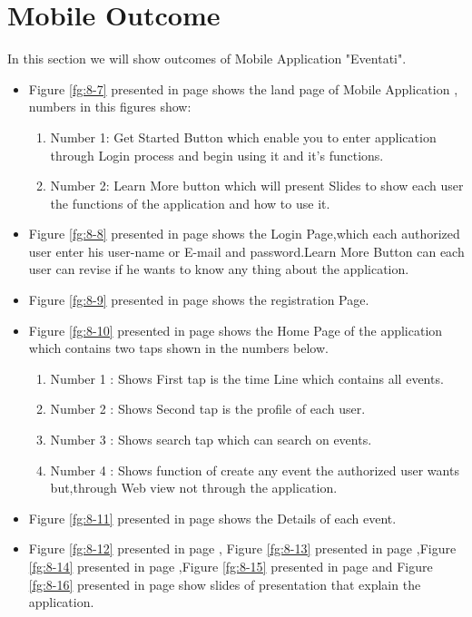 \documentclass[12pt,a4paper,class,twoside,openany]{report}
\begin{document}
{\section{Mobile Outcome}
In this section we will show outcomes of  Mobile Application "Eventati".
\begin{itemize}
 \item Figure \ref{fg:8-7} presented in page \pageref{fg:8-7} shows the land page of Mobile Application , numbers in this figures show:
\begin{enumerate}
\item Number 1: Get Started Button which enable you to enter application through Login process and begin using it and it's functions.
\item Number 2: Learn More button which will present Slides to show each user the functions of the application and how to use it.
\end{enumerate}
\item Figure \ref{fg:8-8} presented in page \pageref{fg:8-8} shows the Login Page,which each authorized user enter his user-name or E-mail and password.Learn More Button can each user can revise if he wants to know any thing about the application.
\item Figure \ref{fg:8-9} presented in page \pageref{fg:8-9} shows the registration Page.
\item Figure \ref{fg:8-10} presented in page \pageref{fg:8-10} shows the Home Page of the application which contains two taps shown in the numbers below.
\begin{enumerate}
\item Number 1 : Shows First tap  is the time Line which contains all events.
\item Number 2 : Shows Second tap is the profile of each user.
\item Number 3 : Shows search tap which can search on events.
\item Number 4 : Shows function of create any event the authorized user wants but,through Web view not through the application.
\end{enumerate}
\item Figure \ref{fg:8-11} presented in page \pageref{fg:8-11} shows the Details of each event.
\item Figure \ref{fg:8-12} presented in page \pageref{fg:8-12}, Figure \ref{fg:8-13} presented in page \pageref{fg:8-13} ,Figure \ref{fg:8-14} presented in page \pageref{fg:8-14},Figure \ref{fg:8-15} presented in page \pageref{fg:8-15} and Figure \ref{fg:8-16} presented in page \pageref{fg:8-16} show slides of presentation that explain the application.
\end{itemize}

}
\end{document}
